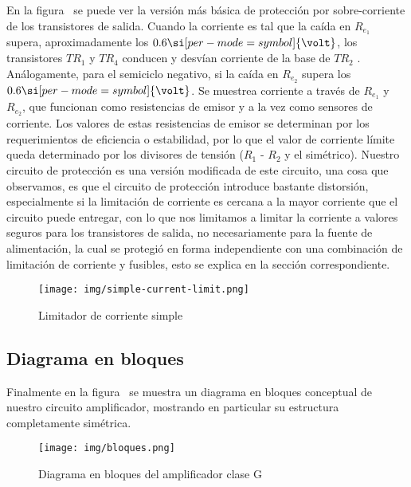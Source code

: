 
En la figura~ se puede ver la versión más básica de protección por sobre-corriente de los transistores de salida. Cuando la corriente es tal que la caída en $R_{e_{1}}$ supera, aproximadamente los $0.6 \si[per-mode=symbol]{\volt}$, los transistores $TR_{1}$ y $TR_{4}$ conducen y desvían corriente de la base de $TR_{2}$ . Análogamente, para el semiciclo negativo, si la caída en $R_{e_{2}}$ supera los $0.6 \si[per-mode=symbol]{\volt}$. Se muestrea corriente a través de $R_{e_{1}}$ y $R_{e_{2}}$, que funcionan como resistencias de emisor y a la vez como sensores de corriente. Los valores de estas resistencias de emisor se determinan por los requerimientos de eficiencia o estabilidad, por lo que el valor de corriente límite queda determinado por los divisores de tensión ($R_{1}$ - $R_{2}$ y el simétrico). Nuestro circuito de protección es una versión modificada de este circuito, una cosa que observamos, es que el circuito de protección introduce bastante distorsión, especialmente si la limitación de corriente es cercana a la mayor corriente que el circuito puede entregar, con lo que nos limitamos a limitar la corriente a valores seguros para los transistores de salida, no necesariamente para la fuente de alimentación, la cual se protegió en forma independiente con una combinación de limitación de corriente y fusibles, esto se explica en la sección correspondiente.


\begin{figure}[H]
	\centering
	\texttt{[image: img/simple-current-limit.png]}
	\caption{Limitador de corriente simple}
	\label{fig:simple-current-limit}
\end{figure}



\subsection{Diagrama en bloques}

Finalmente en la figura~ se muestra un diagrama en bloques conceptual de nuestro circuito amplificador, mostrando en particular su estructura completamente simétrica.


\begin{figure}[H]
	\centering
	\texttt{[image: img/bloques.png]}
	\caption{Diagrama en bloques del amplificador clase G}
	\label{fig:ampli_bloques}
\end{figure}
